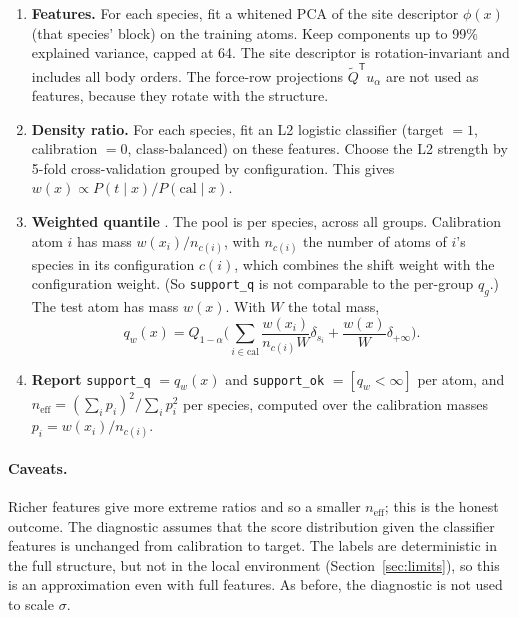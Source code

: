 \documentclass[11pt,a4paper]{article}
\newcommand{\T}{\mathsf{T}}
\newcommand{\Qt}{\tilde{Q}}
\newcommand{\code}[1]{\texttt{#1}}
\begin{document}
\begin{enumerate}
\item \textbf{Features.} For each species, fit a whitened PCA of the site descriptor $\phi(x)$ (that
species' block) on the training atoms. Keep components up to 99\% explained variance, capped at 64.
The site descriptor is rotation-invariant and includes all body orders. The force-row projections
$\Qt^\T u_\alpha$ are not used as features, because they rotate with the structure.

\item \textbf{Density ratio.} For each species, fit an L2 logistic classifier (target $=1$,
calibration $=0$, class-balanced) on these features. Choose the L2 strength by 5-fold cross-validation
grouped by configuration. This gives $w(x)\propto P(t\mid x)/P(\mathrm{cal}\mid x)$.

\item \textbf{Weighted quantile} \cite{tibshirani2019}. The pool is per species, across all groups.
Calibration atom $i$ has mass $w(x_i)/n_{c(i)}$, with $n_{c(i)}$ the number of atoms of $i$'s species
in its configuration $c(i)$, which combines the shift weight with the configuration weight. (So
\code{support\_q} is not comparable to the per-group $q_g$.) The test atom has mass $w(x)$. With
$W$ the total mass,
\begin{equation}
q_w(x)=Q_{1-\alpha}\Big(\sum_{i\in\mathrm{cal}}\frac{w(x_i)}{n_{c(i)}W}\delta_{s_i}+\frac{w(x)}{W}\delta_{+\infty}\Big).
\end{equation}

\item \textbf{Report} \code{support\_q} $=q_w(x)$ and \code{support\_ok} $=[q_w<\infty]$ per atom,
and $n_{\mathrm{eff}}=(\sum_i p_i)^2/\sum_i p_i^2$ per species, computed over the calibration masses
$p_i=w(x_i)/n_{c(i)}$.
\end{enumerate}

\paragraph{Caveats.} Richer features give more extreme ratios and so a smaller $n_{\mathrm{eff}}$;
this is the honest outcome. The diagnostic assumes that the score distribution given the classifier
features is unchanged from calibration to target. The labels are deterministic in the full structure,
but not in the local environment (Section~\ref{sec:limits}), so this is an approximation even with full
features. As before, the diagnostic is not used to scale $\sigma$.
\end{document}
